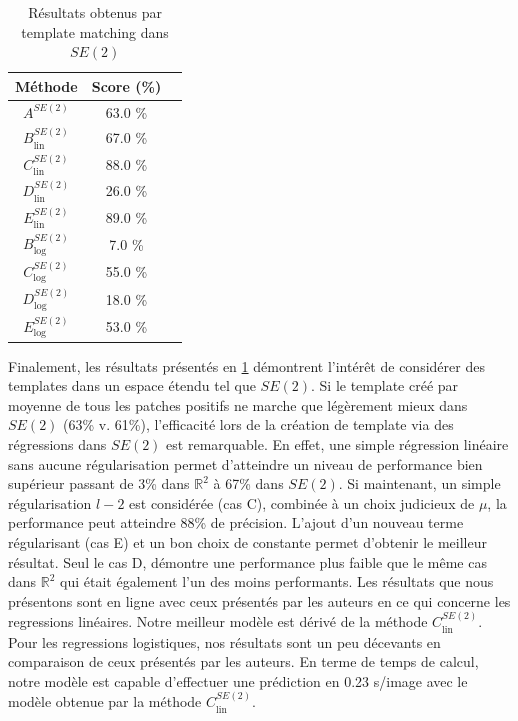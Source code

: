 \documentclass{article}
\begin{document}
\begin{table}[h!]
    \centering
    \begin{tabular}{|c|c|c|}
        \hline
        Méthode & Score (\%)\\
        \hline
        \hline
        $A^{SE(2)}$&  63.0 \% \\
        \hline
        $B_{\text{lin}}^{SE(2)}$&  67.0    \%   \\
        $C_{\text{lin}}^{SE(2)}$&  88.0    \%   \\
        $D_{\text{lin}}^{SE(2)}$&  26.0   \%   \\
        $E_{\text{lin}}^{SE(2)}$&  89.0    \%   \\
        \hline
        $B_{\text{log}}^{SE(2)} $&  7.0  \%   \\ 
        $C_{\text{log}}^{SE(2)} $&  55.0  \%   \\ 
        $D_{\text{log}}^{SE(2)} $&  18.0 \%   \\ 
        $E_{\text{log}}^{SE(2)} $&  53.0  \%   \\ 
        \hline
    \end{tabular}
    \caption{Résultats obtenus par template matching dans $SE(2)$}
    \label{table: SE(2)}
\end{table}

Finalement, les résultats présentés en \ref{table: SE(2)} démontrent l'intérêt de considérer des templates dans un espace étendu tel que $SE(2)$.
Si le template créé par moyenne de tous les patches positifs ne marche que légèrement mieux dans $SE(2)$ (63\% v. 61\%), l'efficacité 
lors de la création de template via des régressions dans $SE(2)$ est remarquable. En effet, une simple régression linéaire sans aucune régularisation permet 
d'atteindre un niveau de performance bien supérieur passant de 3\% dans $\mathbb{R}^2$ à 67\% dans $SE(2)$. Si maintenant, 
un simple régularisation $l-2$ est considérée (cas C), combinée à un choix judicieux de $\mu$,  la performance peut atteindre 88\% de précision.
L'ajout d'un nouveau terme régularisant (cas E) et un bon choix de constante permet d'obtenir le meilleur résultat. Seul le cas D, démontre une 
performance plus faible que le même cas dans $\mathbb{R}^2$ qui était également l'un des moins performants. Les résultats que nous présentons sont en ligne avec ceux 
présentés par les auteurs en ce qui concerne les regressions linéaires. Notre meilleur modèle est dérivé de la méthode $C_{\text{lin}}^{SE(2)}$. Pour 
les regressions logistiques, nos résultats sont un peu décevants en comparaison de ceux présentés par les auteurs. 
En terme de temps de calcul, notre modèle est capable d'effectuer une prédiction en 0.23 s/image avec le modèle obtenue par la méthode $C_{\text{lin}}^{SE(2)}$.
\end{document}
